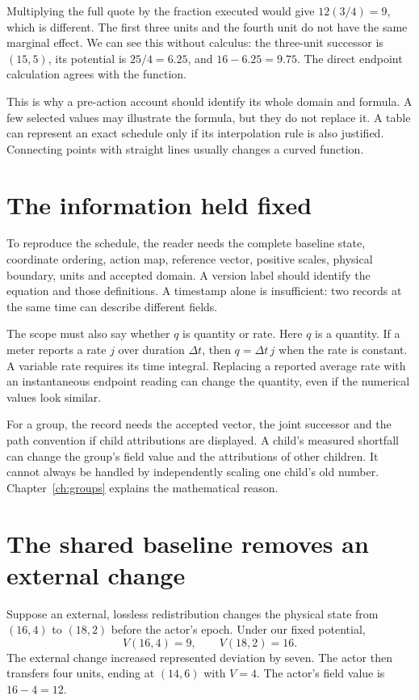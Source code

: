 Multiplying the full quote by the fraction executed would give $12(3/4)=9$, which is different. The first three units and the fourth unit do not have the same marginal effect. We can see this without calculus: the three-unit successor is $(15,5)$, its potential is $25/4=6.25$, and $16-6.25=9.75$. The direct endpoint calculation agrees with the function.

This is why a pre-action account should identify its whole domain and formula. A few selected values may illustrate the formula, but they do not replace it. A table can represent an exact schedule only if its interpolation rule is also justified. Connecting points with straight lines usually changes a curved function.


\section{The information held fixed}
To reproduce the schedule, the reader needs the complete baseline state, coordinate ordering, action map, reference vector, positive scales, physical boundary, units and accepted domain. A version label should identify the equation and those definitions. A timestamp alone is insufficient: two records at the same time can describe different fields.

The scope must also say whether $q$ is quantity or rate. Here $q$ is a quantity. If a meter reports a rate $j$ over duration $\Delta t$, then $q=\Delta t\,j$ when the rate is constant. A variable rate requires its time integral. Replacing a reported average rate with an instantaneous endpoint reading can change the quantity, even if the numerical values look similar.

For a group, the record needs the accepted vector, the joint successor and the path convention if child attributions are displayed. A child's measured shortfall can change the group's field value and the attributions of other children. It cannot always be handled by independently scaling one child's old number. Chapter~\ref{ch:groups} explains the mathematical reason.

\section{The shared baseline removes an external change}
Suppose an external, lossless redistribution changes the physical state from $(16,4)$ to $(18,2)$ before the actor's epoch. Under our fixed potential,
\[
 V(16,4)=9,\qquad V(18,2)=16.
\]
The external change increased represented deviation by seven. The actor then transfers four units, ending at $(14,6)$ with $V=4$. The actor's field value is $16-4=12$.

